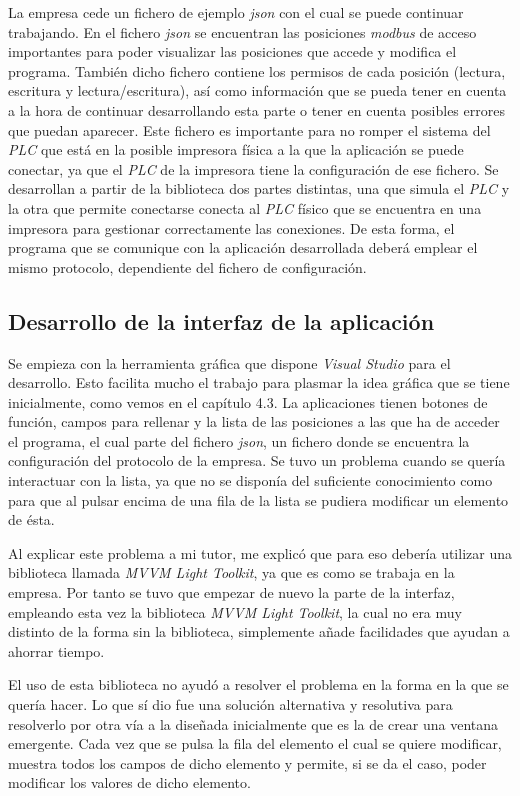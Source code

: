 \documentclass[pdftex,11pt,a4paper]{book}
\begin{document}
La empresa cede un fichero de ejemplo \emph{json} con el cual se puede continuar trabajando. En el fichero \emph{json} se encuentran las posiciones \emph{modbus} de acceso importantes para poder visualizar las posiciones que accede y modifica el programa. También dicho fichero contiene los permisos de cada posición (lectura, escritura y lectura/escritura), así como información que se pueda tener en cuenta a la hora de continuar desarrollando esta parte o tener en cuenta posibles errores que puedan aparecer. Este fichero es importante para no romper el sistema del \emph{PLC} que está en la posible impresora física a la que la aplicación se puede conectar, ya que el \emph{PLC} de la impresora tiene la configuración de ese fichero. Se desarrollan a partir de la biblioteca dos partes distintas, una que simula el \emph{PLC} y la otra que permite conectarse conecta al \emph{PLC} físico que se encuentra en una impresora para gestionar correctamente las conexiones. De esta forma, el programa que se comunique con la aplicación desarrollada deberá emplear el mismo protocolo, dependiente del fichero de configuración.

\subsection{Desarrollo de la interfaz de la aplicación}

Se empieza con la herramienta gráfica que dispone \emph{Visual Studio} para el desarrollo. Esto facilita mucho el trabajo para plasmar la idea gráfica que se tiene inicialmente, como vemos en el capítulo 4.3. La aplicaciones tienen botones de función, campos para rellenar y la lista de las posiciones a las que ha de acceder el programa, el cual parte del fichero \emph{json}, un fichero donde se encuentra la configuración del protocolo de la empresa. Se tuvo un problema cuando se quería interactuar con la lista, ya que no se disponía del suficiente conocimiento como para que al pulsar encima de una fila de la lista se pudiera modificar un elemento de ésta.

Al explicar este problema a mi tutor, me explicó que para eso debería utilizar una biblioteca llamada \emph{MVVM Light Toolkit}, ya que es como se trabaja en la empresa. Por tanto se tuvo que empezar de nuevo la parte de la interfaz, empleando esta vez la biblioteca \emph{MVVM Light Toolkit}, la cual no era muy distinto de la forma sin la biblioteca, simplemente añade facilidades que ayudan a ahorrar tiempo.

El uso de esta biblioteca no ayudó a resolver el problema en la forma en la que se quería hacer. Lo que sí dio fue una solución alternativa y resolutiva para resolverlo por otra vía a la diseñada inicialmente que es la de crear una ventana emergente. Cada vez que se pulsa la fila del elemento el cual se quiere modificar, muestra todos los campos de dicho elemento y permite, si se da el caso, poder modificar los valores de dicho elemento. %
\end{document}

